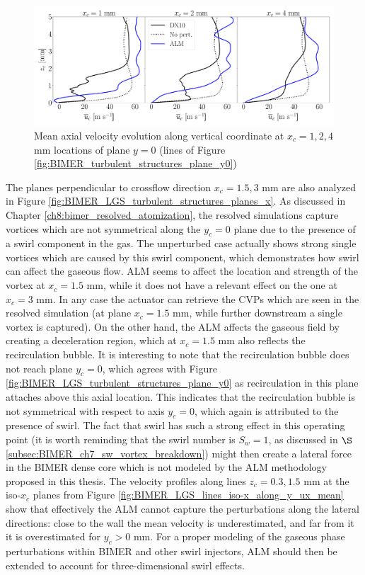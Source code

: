 \begin{figure}[ht]
\centering
   \includegraphics[scale=0.24]{./part3_applications/figures_ch9_lagrangian/gas_field_initial_conditions/lines_y0_along_z_ux_mean}
\caption{Mean axial velocity evolution along vertical coordinate at $x_c = 1, 2, 4$ mm locations of plane $y = 0$ (lines of Figure \ref{fig:BIMER_turbulent_structures_plane_y0})}
\label{fig:BIMER_LGS_lines_y0_along_z_ux_mean}
\end{figure}

The planes perpendicular to crossflow direction $x_c = 1.5, 3$ mm are also analyzed in Figure \ref{fig:BIMER_LGS_turbulent_structures_planes_x}.  As discussed in Chapter \ref{ch8:bimer_resolved_atomization}, the resolved simulations capture vortices which are not symmetrical along the $y_c = 0$ plane due to the presence of a swirl component in the gas. The unperturbed case actually shows strong single vortices which are caused by this swirl component, which demonstrates how swirl can affect the gaseous flow. ALM seems to affect the location and strength of the vortex at $x_c = 1.5$ mm, while it does not have a relevant effect on the one at $x_c = 3$ mm. In any case the actuator can retrieve the CVPs which are seen in the resolved simulation (at plane $x_c = 1.5$ mm, while further downstream a single vortex is captured). On the other hand, the ALM affects the gaseous field by creating a deceleration region, which at $x_c = 1.5$ mm also reflects the recirculation bubble. It is interesting to note that the recirculation bubble does not reach plane $y_c = 0$, which agrees with Figure \ref{fig:BIMER_LGS_turbulent_structures_plane_y0}  as recirculation in this plane attaches above this axial location. This indicates that the recirculation bubble is not symmetrical with respect to axis $y_c = 0$, which again is attributed to the presence of swirl. The fact that swirl has such a strong effect in this operating point (it is worth reminding that the swirl number is $S_w = 1$, as discussed in $\S$\ref{subsec:BIMER_ch7_sw_vortex_breakdown}) might then create a lateral force in the BIMER dense core which is not modeled by the ALM methodology proposed in this thesis. The velocity profiles along lines $z_c = 0.3, 1.5$ mm at the iso-$x_c$ planes from Figure \ref{fig:BIMER_LGS_lines_iso-x_along_y_ux_mean} show that effectively the ALM cannot capture the perturbations along the lateral directions: close to the wall the mean velocity is underestimated, and far from it it is overestimated for $y_c > 0$ mm. For a proper modeling of the gaseous phase perturbations within BIMER and other swirl injectors, ALM should then be extended to account for three-dimensional swirl effects. 


